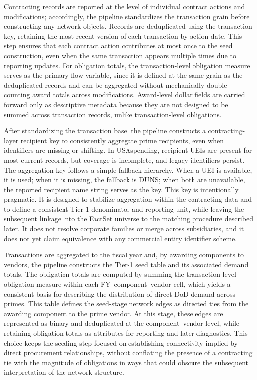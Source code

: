 Contracting records are reported at the level of individual contract actions and modifications; accordingly, the pipeline standardizes the transaction grain before constructing any network objects. Records are deduplicated using the transaction key, retaining the most recent version of each transaction by action date. This step ensures that each contract action contributes at most once to the seed construction, even when the same transaction appears multiple times due to reporting updates. For obligation totals, the transaction-level obligation measure serves as the primary flow variable, since it is defined at the same grain as the deduplicated records and can be aggregated without mechanically double-counting award totals across modifications. Award-level dollar fields are carried forward only as descriptive metadata because they are not designed to be summed across transaction records, unlike transaction-level obligations.

After standardizing the transaction base, the pipeline constructs a contracting-layer recipient key to consistently aggregate prime recipients, even when identifiers are missing or shifting. In USAspending, recipient UEIs are present for most current records, but coverage is incomplete, and legacy identifiers persist. The aggregation key follows a simple fallback hierarchy. When a UEI is available, it is used; when it is missing, the fallback is DUNS; when both are unavailable, the reported recipient name string serves as the key. This key is intentionally pragmatic. It is designed to stabilize aggregation within the contracting data and to define a consistent Tier-1 denominator and reporting unit, while leaving the subsequent linkage into the FactSet universe to the matching procedure described later. It does not resolve corporate families or merge across subsidiaries, and it does not yet claim equivalence with any commercial entity identifier scheme.

Transactions are aggregated to the fiscal year and, by awarding components to vendors, the pipeline constructs the Tier-1 seed table and its associated demand totals. The obligation totals are computed by summing the transaction-level obligation measure within each FY--component--vendor cell, which yields a consistent basis for describing the distribution of direct DoD demand across primes. This table defines the seed-stage network edges as directed ties from the awarding component to the prime vendor. At this stage, these edges are represented as binary and deduplicated at the component--vendor level, while retaining obligation totals as attributes for reporting and later diagnostics. This choice keeps the seeding step focused on establishing connectivity implied by direct procurement relationships, without conflating the presence of a contracting tie with the magnitude of obligations in ways that could obscure the subsequent interpretation of the network structure.


